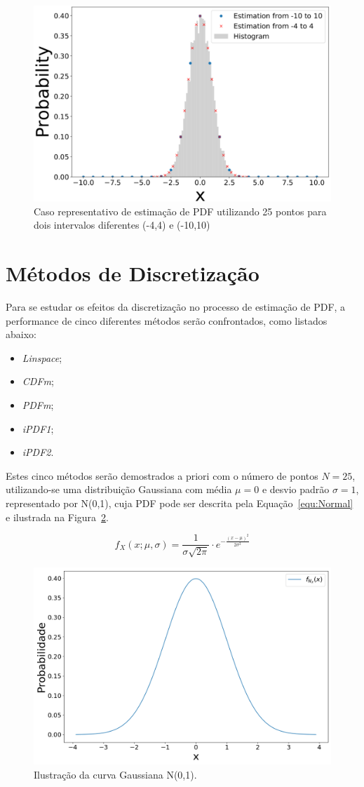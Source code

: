 \begin{figure}[H]
	\centering
	\includegraphics[width=0.6\linewidth]{figuras/linspace2}
	\caption{Caso representativo de estimação de PDF utilizando 25 pontos para dois intervalos diferentes (-4,4) e (-10,10)}
	\label{fig:figura1}
\end{figure}


\section{Métodos de Discretização} \label{cap:metodos}
Para se estudar os efeitos da discretização no processo de estimação de \ac{PDF}, a performance de cinco diferentes métodos serão confrontados, como listados abaixo: 
\begin{itemize}
	\item \textit{Linspace};
	\item \textit{CDFm};
	\item \textit{PDFm};
	\item \textit{iPDF1};
	\item \textit{iPDF2}.
\end{itemize}

Estes cinco métodos serão demostrados a priori com o número de pontos $ N = 25 $,  utilizando-se uma distribuição Gaussiana com média $\mu = 0$ e desvio padrão $\sigma = 1$, representado por N(0,1), cuja \ac{PDF} pode ser descrita pela Equação~\eqref{equ:Normal} e ilustrada na Figura~\ref{fig:Gaussiana}.

\begin{equation}
{\displaystyle f_{X}(x;\mu,\sigma) = \frac{1}{\sigma\sqrt{2\pi}}\cdot e^{-\frac{(x-\mu)^2}{2\sigma^2}}}
\label{equ:Normal}
\end{equation}


\begin{figure}[H]
	\centering
	\includegraphics[width=0.6\linewidth]{./figuras/Normal}
	\caption{Ilustração da curva Gaussiana N(0,1).}
	\label{fig:Gaussiana}
\end{figure}


